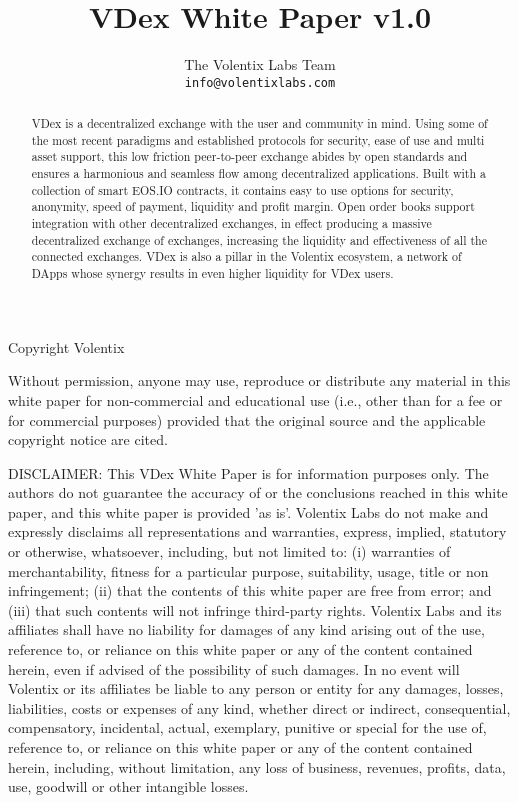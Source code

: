 \documentclass[]{article}
\title{VDex White Paper v1.0}
\author{
		The Volentix Labs Team\\
	\texttt{info@volentixlabs.com}
}
\begin{document}
\tableofcontents
\maketitle
\begin{description}
\item Copyright  Volentix
\end{description}

{\tiny Without permission, anyone may use, reproduce or distribute any material in this white paper for non-commercial and educational use (i.e., other than for a fee or for commercial purposes) provided that the original source and the applicable copyright notice are cited.

DISCLAIMER: This VDex White Paper  is for information purposes only. The authors do not guarantee the accuracy of or the conclusions reached in this white paper, and this white paper is provided 'as is'. 
Volentix Labs do not make and expressly disclaims all representations and warranties, express, implied, statutory or otherwise, whatsoever, including, but not limited to: 
(i) warranties of merchantability, fitness for a particular purpose, suitability, usage, title or non infringement; (ii) that the contents of this white paper are free from error; and (iii) that such contents will not infringe third-party rights. Volentix Labs and its affiliates shall have no liability for damages of any kind arising out of the use, reference to, or reliance on this white paper or any of the content contained herein, even if advised of the possibility of such damages. In no event will Volentix or its affiliates be liable to any person or entity for any damages, losses, liabilities, costs or expenses of any kind, whether direct or indirect, consequential, compensatory, incidental, actual, exemplary, punitive or special for the use of, reference to, or reliance on this white paper or any of the content contained herein, including, without limitation, any loss of business, revenues, profits, data, use, goodwill or other intangible losses.}

\begin{abstract}

VDex is a decentralized exchange with the user and community in mind. 
Using some of the most recent paradigms and established protocols for security, 
ease of use and multi asset support, this low friction peer-to-peer exchange 
abides by open standards and ensures a harmonious and seamless flow among 
decentralized applications. Built with a collection of smart EOS.IO contracts, 
it contains easy to use options for security, anonymity, speed of payment, liquidity and profit margin.
Open order books support integration with other decentralized exchanges, 
in effect producing a massive decentralized exchange of exchanges,
 increasing the liquidity and effectiveness of all the connected exchanges.
VDex is also a pillar in the Volentix ecosystem, a network of DApps whose synergy results in even
higher liquidity for VDex users.
\end{abstract}
\end{document}

